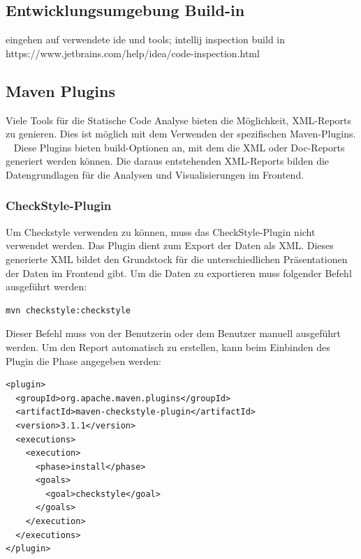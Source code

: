 \subsection{Entwicklungsumgebung Build-in}
eingehen auf verwendete ide und tools; intellij inspection build in 
https://www.jetbrains.com/help/idea/code-inspection.html

\subsection{Maven Plugins}
Viele Tools für die Statische Code Analyse bieten die Möglichkeit, XML-Reports zu genieren. Dies ist möglich mit dem Verwenden der spezifischen Maven-Plugins. ~\parencite{spotBugsUsage} \cite{checkstylePlugin} 
Diese Plugins bieten build-Optionen an, mit dem die XML oder Doc-Reports generiert werden können. Die daraus entstehenden XML-Reports bilden die Datengrundlagen für die Analysen und Visualisierungen im Frontend.
\subsubsection{CheckStyle-Plugin}
Um Checkstyle verwenden zu können, muss das CheckStyle-Plugin nicht verwendet werden. Das Plugin dient zum Export der Daten als XML. Dieses generierte XML bildet den Grundstock für die unterschiedlichen Präsentationen der Daten im Frontend gibt. Um die Daten zu exportieren muss folgender Befehl ausgeführt werden:
\begin{verbatim}
mvn checkstyle:checkstyle
\end{verbatim}
Dieser Befehl muss von der Benutzerin oder dem Benutzer manuell ausgeführt werden. Um den Report automatisch zu erstellen, kann beim Einbinden des Plugin die Phase angegeben werden:

\lstset{
  caption={Das Plugin wird automatisch in der install-Phase ausgeführt.}, 
  basicstyle=\small\ttfamily, 
  label=lst:main, 
  language=Java,
  frame=single,
  breaklines=true, %
  postbreak=\mbox{\textcolor{red}{$\hookrightarrow$}\space},
}

\begin{samepage}%
	\begin{lstlisting}[float=tbhp]
<plugin>
  <groupId>org.apache.maven.plugins</groupId>
  <artifactId>maven-checkstyle-plugin</artifactId>
  <version>3.1.1</version>
  <executions>
    <execution>
      <phase>install</phase>
      <goals>
        <goal>checkstyle</goal>
      </goals>
    </execution>
  </executions>
</plugin>
	\end{lstlisting}
\end{samepage}

